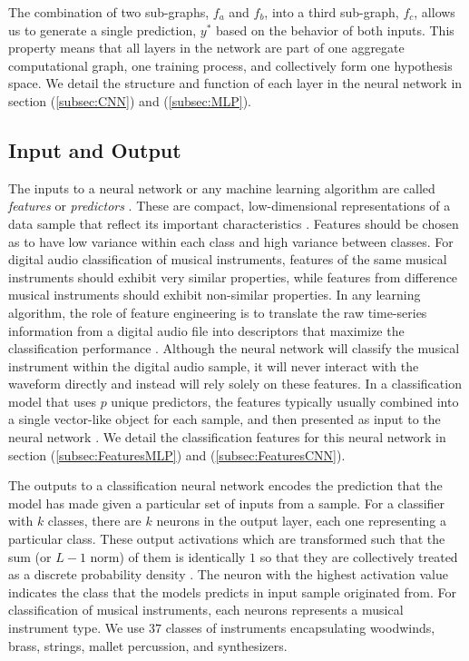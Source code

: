 \documentclass[conference,onecolumn,letterpaper]{IEEEtran}
\begin{document}
The combination of two sub-graphs, $f_a$ and $f_b$, into a third sub-graph, $f_c$, allows us to generate a single prediction, $y^*$ based on the behavior of both inputs. This property means that all layers in the network are part of one aggregate computational graph, one training process, and collectively form one hypothesis space. We detail the structure and function of each layer in the neural network in section (\ref{subsec:CNN}) and (\ref{subsec:MLP}).


\subsection{Input and Output}
\label{subsec:InputOutput}

The inputs to a neural network or any machine learning algorithm are called \textit{features} or \textit{predictors} \cite{James}. These are compact, low-dimensional representations of a data sample that reflect its important characteristics \cite{Liu}. Features should be chosen as to have low variance within each class and high variance between classes. For digital audio classification of musical instruments, features of the same musical instruments should exhibit very similar properties, while features from difference musical instruments should exhibit non-similar properties. In any learning algorithm, the role of feature engineering is to translate the raw time-series information from a digital audio file into descriptors that maximize the classification performance \cite{Virtanen}. Although the neural network will classify the musical instrument within the digital audio sample, it will never interact with the waveform directly and instead will rely solely on these features. In a classification model that uses $p$ unique predictors, the features typically usually combined into a single vector-like object for each sample, and then presented as input to the neural network \cite{Geron}. We detail the classification features for this neural network in section (\ref{subsec:FeaturesMLP}) and (\ref{subsec:FeaturesCNN}). 

The outputs to a classification neural network encodes the prediction that the model has made given a particular set of inputs from a sample. For a classifier with $k$ classes, there are $k$ neurons in the output layer, each one representing a particular class. These output activations which are transformed such that the sum (or $L-1$ norm) of them is identically $1$ so that they are collectively treated as a discrete probability density \cite{Goodfellow,James}. The neuron with the highest activation value indicates the class that the models predicts in input sample originated from. For classification of musical instruments, each neurons represents a musical instrument type. We use $37$ classes of instruments encapsulating woodwinds, brass, strings, mallet percussion, and synthesizers. 
\end{document}
